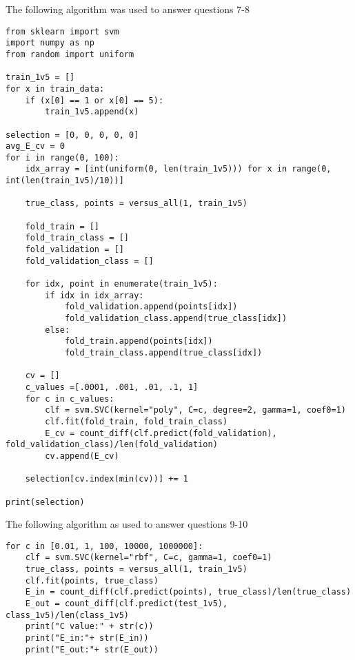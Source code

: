 \documentclass{article}
\begin{document}
\newpage
{\huge The following algorithm was used to answer questions 7-8}
\begin{verbatim}
from sklearn import svm
import numpy as np
from random import uniform

train_1v5 = []
for x in train_data:
    if (x[0] == 1 or x[0] == 5):
        train_1v5.append(x)

selection = [0, 0, 0, 0, 0]
avg_E_cv = 0
for i in range(0, 100):
    idx_array = [int(uniform(0, len(train_1v5))) for x in range(0, int(len(train_1v5)/10))]

    true_class, points = versus_all(1, train_1v5)

    fold_train = []
    fold_train_class = []
    fold_validation = []
    fold_validation_class = []

    for idx, point in enumerate(train_1v5):
        if idx in idx_array:
            fold_validation.append(points[idx])
            fold_validation_class.append(true_class[idx])
        else:
            fold_train.append(points[idx])
            fold_train_class.append(true_class[idx])

    cv = []
    c_values =[.0001, .001, .01, .1, 1]
    for c in c_values:
        clf = svm.SVC(kernel="poly", C=c, degree=2, gamma=1, coef0=1)
        clf.fit(fold_train, fold_train_class)  
        E_cv = count_diff(clf.predict(fold_validation), fold_validation_class)/len(fold_validation)
        cv.append(E_cv)
    
    selection[cv.index(min(cv))] += 1

print(selection)
\end{verbatim}

\newpage
{\huge The following algorithm as used to answer questions 9-10}
\begin{verbatim}
for c in [0.01, 1, 100, 10000, 1000000]:
    clf = svm.SVC(kernel="rbf", C=c, gamma=1, coef0=1)
    true_class, points = versus_all(1, train_1v5)
    clf.fit(points, true_class)  
    E_in = count_diff(clf.predict(points), true_class)/len(true_class)
    E_out = count_diff(clf.predict(test_1v5), class_1v5)/len(class_1v5)
    print("C value:" + str(c))
    print("E_in:"+ str(E_in))
    print("E_out:"+ str(E_out))
\end{verbatim}
\end{document}

